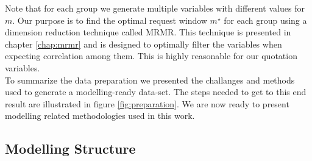 \documentclass[12pt,titlepage]{article}
\begin{document}
\noindent
Note that for each group we generate multiple variables with different values for $m$. Our purpose is to find the optimal request window $m^{\star}$ for each group using a dimension reduction technique called MRMR. This technique is presented in chapter \ref{chap:mrmr} and is designed to optimally filter the variables when expecting correlation among them. This is highly reasonable for our quotation variables.\\

\noindent
To summarize the data preparation we presented the challanges and methods used to generate a modelling-ready data-set. The steps needed to get to this end result are illustrated in figure \ref{fig:preparation}. We are now ready to present modelling related methodologies used in this work. \\

\subsection{Modelling Structure} \par
\label{chap:modstruct}
\end{document}
